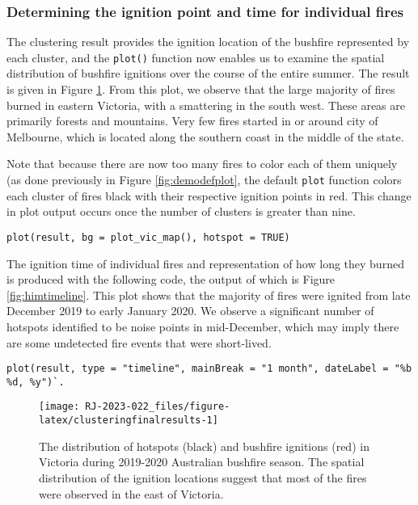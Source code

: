 \hypertarget{determining-the-ignition-point-and-time-for-individual-fires}{%
\subsubsection{Determining the ignition point and time for individual fires}\label{determining-the-ignition-point-and-time-for-individual-fires}}

The clustering result provides the ignition location of the bushfire represented by each cluster, and the \texttt{plot()} function now enables us to examine the spatial distribution of bushfire ignitions over the course of the entire summer. The result is given in Figure \ref{fig:clusteringfinalresults}. From this plot, we observe that the large majority of fires burned in eastern Victoria, with a smattering in the south west. These areas are primarily forests and mountains. Very few fires started in or around city of Melbourne, which is located along the southern coast in the middle of the state.

Note that because there are now too many fires to color each of them uniquely (as done previously in Figure \ref{fig:demodefplot}, the default \texttt{plot} function colors each cluster of fires black with their respective ignition points in red. This change in plot output occurs once the number of clusters is greater than nine.

\begin{verbatim}
plot(result, bg = plot_vic_map(), hotspot = TRUE)
\end{verbatim}

The ignition time of individual fires and representation of how long they burned is produced with the following code, the output of which is Figure \ref{fig:himtimeline}. This plot shows that the majority of fires were ignited from late December 2019 to early January 2020. We observe a significant number of hotspots identified to be noise points in mid-December, which may imply there are some undetected fire events that were short-lived.

\begin{verbatim}
plot(result, type = "timeline", mainBreak = "1 month", dateLabel = "%b %d, %y")`. 
\end{verbatim}

\begin{figure}

{\centering \texttt{[image: RJ-2023-022\_files/figure-latex/clusteringfinalresults-1]} 

}

\caption{ The distribution of hotspots (black) and bushfire ignitions (red) in Victoria during 2019-2020 Australian bushfire season. The spatial distribution of the ignition locations suggest that most of the fires were observed in the east of Victoria.}\label{fig:clusteringfinalresults}
\end{figure}

